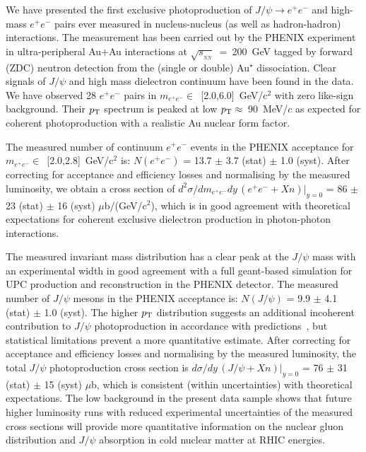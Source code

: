 \documentclass[dvipdfm]{elsart}
\newcommand{\sqrtsnn}{\sqrt{s_{_{NN}}}}
\providecommand{\jpsi}{J/\psi}
\begin{document}
We have presented the first exclusive photoproduction of $\jpsi\to e^+e^-$ 
and high-mass $e^+e^-$ pairs ever measured in nucleus-nucleus (as well as 
hadron-hadron) interactions. The measurement has been 
carried out by the PHENIX experiment in ultra-peripheral Au+Au interactions 
at $\sqrtsnn$~=~200~GeV tagged by forward (ZDC) neutron detection from the 
(single or double) Au$^\star$ dissociation. Clear signals of $\jpsi$ and 
high mass dielectron continuum have been found in the data. We have 
observed 28 $e^+ e^-$ pairs in $m_{e^+e^-}\in$~\mbox{[2.0,6.0]~GeV/c}$^2$ 
with zero like-sign background. Their $p_{\rm T}$ spectrum is peaked at low 
$p_{\rm T}\approx$~90~MeV/$c$ as expected for coherent photoproduction with a 
realistic Au nuclear form factor.

The measured number of continuum $e^+ e^-$ events in the PHENIX acceptance 
for $m_{e^+e^-}\in$~\mbox{[2.0,2.8]~GeV/c}$^2$ is: $N(e^+ e^-)$ = 13.7 
$\pm$ 3.7 (stat) $\pm$ 1.0 (syst). After correcting for acceptance and 
efficiency losses and normalising by the measured luminosity, we obtain a 
cross section of $d^2 \sigma/dm_{e^+e^-} dy \,(e^+e^- + Xn)|_{y=0}$ = 86 
$\pm$ 23 (stat) $\pm$ 16 (syst) $\mu$b/(GeV/c$^2$), which is in good 
agreement with theoretical expectations for coherent exclusive dielectron 
production in photon-photon interactions.

The measured invariant mass distribution has a clear peak at the $\jpsi$ 
mass with an experimental width in good agreement with a full {\sc 
geant}-based simulation for UPC production and reconstruction in the PHENIX
detector.  The measured number of $\jpsi$ mesons in the PHENIX acceptance 
is: $N(\jpsi)$ = 9.9 $\pm$ 4.1 (stat) $\pm$ 1.0 (syst). 
The higher $p_{\rm T}$ distribution 
suggests an additional incoherent contribution to $\jpsi$ photoproduction 
in accordance with predictions~\cite{Strikman:2005ze}, but statistical 
limitations prevent a more quantitative estimate.  After 
correcting for acceptance and efficiency losses and normalising by the 
measured luminosity, the total $\jpsi$ photoproduction cross section is 
$d\sigma/dy \, (\jpsi + Xn)|_{y=0}$ = 76 $\pm$ 31 (stat) $\pm$ 15 (syst) 
$\mu$b, which is consistent (within uncertainties) with theoretical 
expectations. The low background in the present data sample shows that 
future higher luminosity runs with reduced experimental uncertainties of 
the measured cross sections will provide more quantitative information on 
the nuclear gluon distribution and $\jpsi$ absorption in cold nuclear 
matter at RHIC energies.
\end{document}
